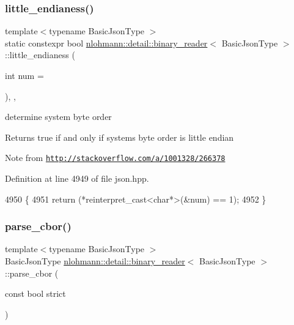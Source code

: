 \subsubsection{\texorpdfstring{little\+\_\+endianess()}{little\_endianess()}}
{\footnotesize\ttfamily template$<$typename Basic\+Json\+Type $>$ \\
static constexpr bool \hyperlink{classnlohmann_1_1detail_1_1binary__reader}{nlohmann\+::detail\+::binary\+\_\+reader}$<$ Basic\+Json\+Type $>$\+::little\+\_\+endianess (\begin{DoxyParamCaption}\item[{int}]{num = {} }\end{DoxyParamCaption})\hspace{0.3cm}{\ttfamily [inline]}, {\ttfamily [static]}, {\ttfamily [noexcept]}}



determine system byte order 

\begin{DoxyReturn}{Returns}
true if and only if system\textquotesingle{}s byte order is little endian
\end{DoxyReturn}
\begin{DoxyNote}{Note}
from \href{http://stackoverflow.com/a/1001328/266378}{\tt http\+://stackoverflow.\+com/a/1001328/266378} 
\end{DoxyNote}


Definition at line 4949 of file json.\+hpp.


\begin{DoxyCode}
4950     \{
4951         \textcolor{keywordflow}{return} (*reinterpret\_cast<char*>(&num) == 1);
4952     \}
\end{DoxyCode}
\mbox{\label{classnlohmann_1_1detail_1_1binary__reader_a04bcdc8f55b26fafa9775a2f89e48fc2}} 
\subsubsection{\texorpdfstring{parse\+\_\+cbor()}{parse\_cbor()}}
{\footnotesize\ttfamily template$<$typename Basic\+Json\+Type $>$ \\
Basic\+Json\+Type \hyperlink{classnlohmann_1_1detail_1_1binary__reader}{nlohmann\+::detail\+::binary\+\_\+reader}$<$ Basic\+Json\+Type $>$\+::parse\+\_\+cbor (\begin{DoxyParamCaption}\item[{const bool}]{strict }\end{DoxyParamCaption})\hspace{0.3cm}{\ttfamily [inline]}}



